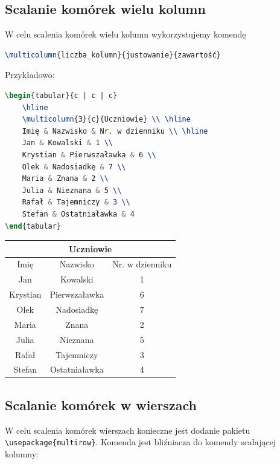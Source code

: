 \documentclass[10pt,a4paper]{article}
\begin{document}
\subsection{Scalanie komórek wielu kolumn}

W celu scalenia komórek wielu kolumn wykorzystujemy komendę

\begin{lstlisting}[language=TeX]
\multicolumn{liczba_kolumn}{justowanie}{zawartość}
\end{lstlisting}

Przykładowo:

\begin{lstlisting}[language=TeX]
\begin{tabular}{c | c | c}
	\hline
	\multicolumn{3}{c}{Uczniowie} \\ \hline
	Imię & Nazwisko & Nr. w dzienniku \\ \hline
	Jan & Kowalski & 1 \\
	Krystian & Pierwszaławka & 6 \\
	Olek & Nadosiadkę & 7 \\
	Maria & Znana & 2 \\
	Julia & Nieznana & 5 \\
	Rafał & Tajemniczy & 3 \\
	Stefan & Ostatniaławka & 4
\end{tabular}
\end{lstlisting}

\begin{tabular}{c | c | c}
	\hline
	\multicolumn{3}{c}{Uczniowie} \\ \hline
	Imię & Nazwisko & Nr. w dzienniku \\ \hline
	Jan & Kowalski & 1 \\
	Krystian & Pierwszaławka & 6 \\
	Olek & Nadosiadkę & 7 \\
	Maria & Znana & 2 \\
	Julia & Nieznana & 5 \\
	Rafał & Tajemniczy & 3 \\
	Stefan & Ostatniaławka & 4
\end{tabular}

\subsection{Scalanie komórek w wierszach}

W celu scalenia komórek wierszach konieczne jest dodanie pakietu \lstinline|\usepackage{multirow}|. Komenda jest bliźniacza do komendy scalającej kolumny:
\end{document}
